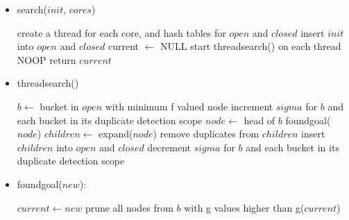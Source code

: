 \documentclass{article}
\begin{document}
\begin{itemize}
  \item search($init$, $cores$)
  \begin{algorithmic}[1]
  \STATE create a thread for each core, and hash tables for $open$ and $closed$
  \STATE insert $init$ into $open$ and $closed$
  \STATE current $\leftarrow$ NULL
  \STATE start threadsearch() on each thread
    \STATE NOOP
  \ENDWHILE
  \STATE return $current$
  \end{algorithmic}

  \item threadsearch()
  \begin{algorithmic}[1]
    \STATE $b \leftarrow$ bucket in $open$ with minimum f valued node
    \STATE increment $sigma$ for $b$ and each bucket in its duplicate detection scope
    \STATE {}
    \STATE {}
    \STATE {}
      \STATE $node \leftarrow$ head of $b$
        \STATE foundgoal($node$)
        \STATE $children \leftarrow$ expand($node$)
        \STATE remove duplicates from $children$
        \STATE insert $children$ into $open$ and $closed$
      \ENDIF
    \ENDFOR
    \STATE {}
    \STATE decrement $sigma$ for $b$ and each bucket in its duplicate detection scope
  \ENDWHILE
  \end{algorithmic}

  \item foundgoal($new$):
  \begin{algorithmic}[1]
        \STATE $current \leftarrow new$
        \STATE prune all nodes from $b$ with g values higher than g($current$)
      \ENDIF
  \end{algorithmic}
\end{itemize}
\end{document}
